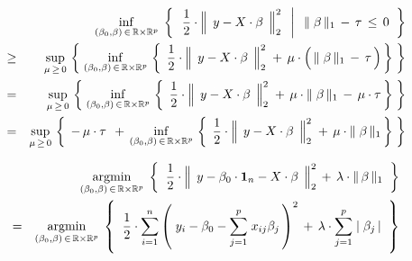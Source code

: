 \begin{eqnarray*}
&&
	\underset{(\beta_{0},\beta)\,\in\,\Re\times\Re^{p}}{\inf}\;
	\left\{\;\;
		\left.
		\dfrac{1}{2}
		\cdot
		\left\Vert\;\, y \overset{{\color{white}.}}{-} X\cdot\beta \,\;\right\Vert_{2}^{2}
		\;\;\,\right\vert\;\;
		\Vert\;\beta\,\Vert_{1} \, - \, \tau \, \leq \, 0
		\;\;\right\}
\\
& \geq &
	\underset{\mu\,\geq\,0}{\sup}\,
	\left\{\;
		\underset{(\beta_{0},\beta)\,\in\,\Re\times\Re^{p}}{\inf}\,
		\left\{\;\,
			\dfrac{1}{2}
			\cdot
			\left\Vert\;\, y \overset{{\color{white}.}}{-} X\cdot\beta \,\;\right\Vert_{2}^{2}
			\; + \,
			\mu
			\cdot
			\left(\, \Vert\;\beta\,\Vert_{1} \, \overset{{\color{white}.}}{-} \, \tau \,\right)
			\,\right\}
		\;\right\}
\\
& = &
	\underset{\mu\,\geq\,0}{\sup}\,
	\left\{\;
		\underset{(\beta_{0},\beta)\,\in\,\Re\times\Re^{p}}{\inf}\,
		\left\{\;\,
			\dfrac{1}{2}
			\cdot
			\left\Vert\;\, y \overset{{\color{white}.}}{-} X\cdot\beta \,\;\right\Vert_{2}^{2}
			\; + \,
			\mu\cdot\Vert\;\beta\,\Vert_{1} \, - \, \mu\cdot\tau
			\,\right\}
		\;\right\}
\\
& = &
	\underset{\mu\,\geq\,0}{\sup}\,
	\left\{\;
		\, - \, \mu\cdot\tau
		\;\, + \,
		\underset{(\beta_{0},\beta)\,\in\,\Re\times\Re^{p}}{\inf}\,
		\left\{\;\,
			\dfrac{1}{2}
			\cdot
			\left\Vert\;\, y \overset{{\color{white}.}}{-} X\cdot\beta \,\;\right\Vert_{2}^{2}
			\; + \,
			\mu\cdot\Vert\;\beta\,\Vert_{1}
			\,\right\}
		\;\right\}
\end{eqnarray*}

\begin{eqnarray*}
&&
	\underset{(\beta_{0},\beta)\,\in\,\Re\times\Re^{p}}{\argmin}\;
	\left\{\;\;
		\dfrac{1}{2}
		\cdot
		\left\Vert\;\, y \overset{{\color{white}.}}{-} \beta_{0}\cdot\mathbf{1}_{n} - X\cdot\beta \,\;\right\Vert_{2}^{2}
		\, + \,
		\lambda\cdot\Vert\,\beta\,\Vert_{1}
		\;\;\right\}
\\
& = &
	\underset{(\beta_{0},\beta)\,\in\,\Re\times\Re^{p}}{\argmin}\;
	\left\{\;\;
		\dfrac{1}{2}
		\cdot
		\overset{n}{\underset{i=1}{\sum}}
		\left(\; y_{i} - \beta_{0} - \overset{p}{\underset{j=1}{\sum}}\;x_{ij}\beta_{j}\,\right)^{2}
		\, + \,
		\lambda\cdot
		\overset{p}{\underset{j=1}{\sum}}\;	
		\vert\;\beta_{j}\,\vert
		\;\;\right\}
\end{eqnarray*}



\renewcommand{\theenumi}{\roman{enumi}}
\renewcommand{\labelenumi}{\textnormal{(\theenumi)}$\;\;$}

